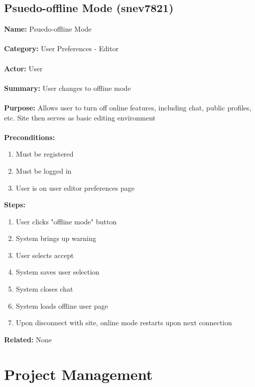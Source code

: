 \documentclass[11pt]{report}
\begin{document}
\subsection{Psuedo-offline Mode (snev7821)}
\begin{framed}
	\noindent\textbf{Name:} Psuedo-offline Mode \\ \\
	\textbf{Category:} User Preferences - Editor  \\ \\
	\textbf{Actor:} User \\ \\
	\textbf{Summary:} User changes to offline mode \\ \\
	\textbf{Purpose:} Allows user to turn off online features, including chat, public profiles, etc. Site then serves as basic editing environment\\ \\
	\textbf{Preconditions:} 
	\begin{enumerate}
		\item Must be registered
		\item Must be logged in
		\item User is on user editor preferences page
	\end{enumerate}
	\textbf{Steps:}
	\begin{enumerate}
		\item User clicks "offline mode" button
		\item System brings up warning
		\item User selects accept
		\item System saves user selection
		\item System closes chat
		\item System loads offline user page
		\item Upon disconnect with site, online mode restarts upon next connection
	\end{enumerate}
	\textbf{Related:} None 
\end{framed}

\section{Project Management}
\end{document}
